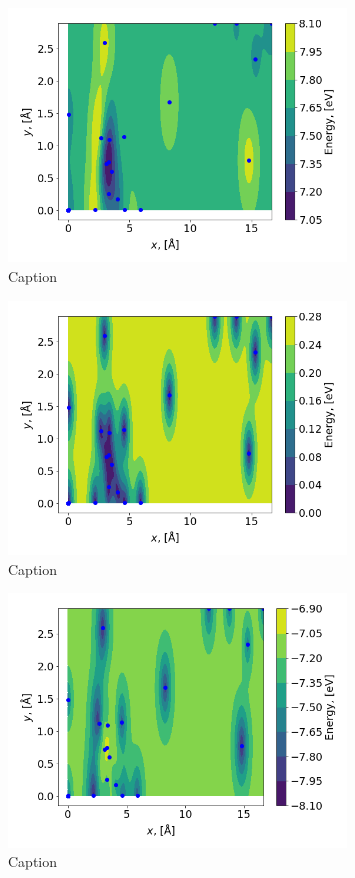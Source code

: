 \documentclass[11pt,a4paper]{article}
\begin{document}
\begin{figure}[H]
    \centering
    \includegraphics[width = 0.8\textwidth]{figures/task3_mean.png}
    \caption{Caption}
    \label{fig:my_label}
\end{figure}

\begin{figure}[H]
    \centering
    \includegraphics[width = 0.8\textwidth]{figures/task3_var.png}
    \caption{Caption}
    \label{fig:my_label}
\end{figure}

\begin{figure}[H]
    \centering
    \includegraphics[width = 0.8\textwidth]{figures/task3_acq.png}
    \caption{Caption}
    \label{fig:my_label}
\end{figure}
\end{document}

